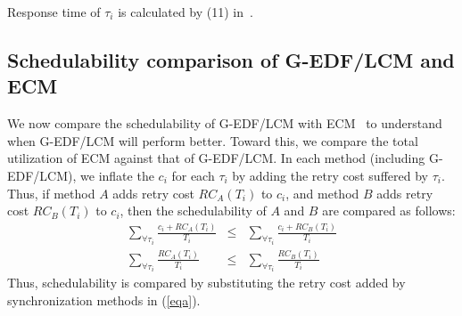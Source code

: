 \documentclass[conference]{IEEEtran}
\begin{document}
Response time of $\tau_{i}$ is calculated by (11) in~\cite{stmconcurrencycontrol:emsoft11}.

\subsection{Schedulability comparison of G-EDF/LCM and ECM}
\label{performance g-edf-lcm}
We now compare the schedulability of G-EDF/LCM with ECM~\cite{stmconcurrencycontrol:emsoft11} %
to understand when G-EDF/LCM will perform better. 
Toward this, we compare the total utilization of ECM against that of G-EDF/LCM. In each method (including G-EDF/LCM), we inflate the $c_i$ for each $\tau_i$ by adding the retry cost suffered by $\tau_i$. Thus, if method $A$ adds retry cost $RC_A(T_i)$ to $c_i$, and method $B$ adds retry cost $RC_B(T_i)$ to $c_i$, then the schedulability of $A$ and $B$ are compared as follows:
\begin{eqnarray}
\sum_{\forall \tau_{i}}\frac{c_{i}+RC_A(T_{i})}{T_{i}} & \le & \sum_{\forall \tau_{i}}\frac{c_{i}+RC_B(T_{i})}{T_{i}}\nonumber\\
\sum_{\forall \tau_{i}}\frac{RC_A(T_{i})}{T_{i}} & \le & \sum_{\forall \tau_{i}}\frac{RC_B(T_{i})}{T_{i}}
\label{eqa}\end{eqnarray}
Thus, schedulability is compared by substituting the retry cost added by synchronization methods in (\ref{eqa}).
\end{document}
